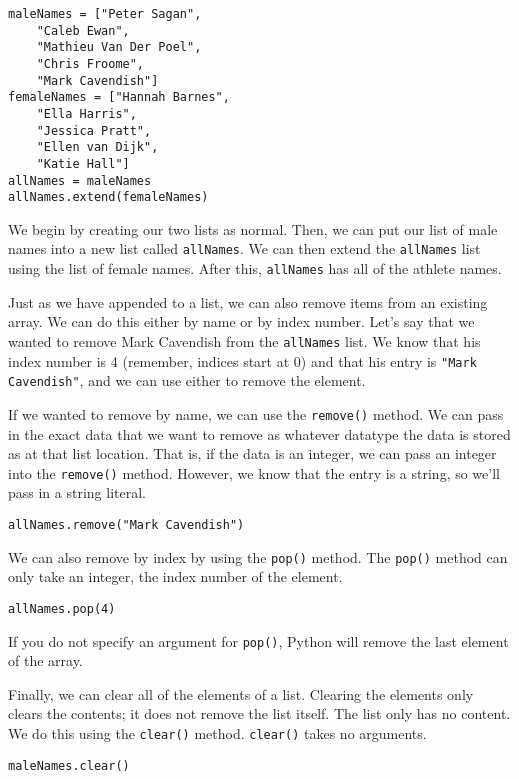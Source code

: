 \begin{lstlisting}[style=pippython]
maleNames = ["Peter Sagan",
    "Caleb Ewan",
    "Mathieu Van Der Poel",
    "Chris Froome",
    "Mark Cavendish"]
femaleNames = ["Hannah Barnes",
    "Ella Harris",
    "Jessica Pratt",
    "Ellen van Dijk",
    "Katie Hall"]
allNames = maleNames
allNames.extend(femaleNames)
\end{lstlisting}
We begin by creating our two lists as normal. Then, we can put our list of male names into a new list called \verb|allNames|. We can then extend the \verb|allNames| list using the list of female names. After this, \verb|allNames| has all of the athlete names.\par
{}
Just as we have appended to a list, we can also remove items from an existing array. We can do this either by name or by index number. Let's say that we wanted to remove Mark Cavendish from the \verb|allNames| list. We know that his index number is 4 (remember, indices start at 0) and that his entry is \verb|"Mark Cavendish"|, and we can use either to remove the element.\par
If we wanted to remove by name, we can use the \verb|remove()| method. We can pass in the exact data that we want to remove as whatever datatype the data is stored as at that list location. That is, if the data is an integer, we can pass an integer into the \verb|remove()| method. However, we know that the entry is a string, so we'll pass in a string literal.
\begin{lstlisting}[style=pippython]
allNames.remove("Mark Cavendish")
\end{lstlisting}
We can also remove by index by using the \verb|pop()| method. The \verb|pop()| method can only take an integer, the index number of the element.
\begin{lstlisting}[style=pippython]
allNames.pop(4)
\end{lstlisting}
If you do not specify an argument for \verb|pop()|, Python will remove the last element of the array.\par
Finally, we can clear all of the elements of a list. Clearing the elements only clears the contents; it does not remove the list itself. The list only has no content. We do this using the \verb|clear()| method. \verb|clear()| takes no arguments.
\begin{lstlisting}[style=pippython]
maleNames.clear()
\end{lstlisting}
